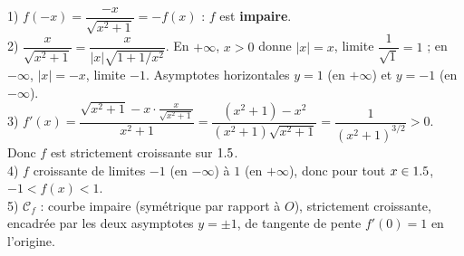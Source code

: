 1) $f(-x)=\dfrac{-x}{\sqrt{x^{2}+1}}=-f(x)$ : $f$ est \textbf{impaire}.\\
2) $\dfrac{x}{\sqrt{x^{2}+1}}=\dfrac{x}{|x|\sqrt{1+1/x^{2}}}$. En $+\infty$, $x>0$ donne $|x|=x$,
limite $\dfrac1{\sqrt1}=1$ ; en $-\infty$, $|x|=-x$, limite $-1$. Asymptotes horizontales
$y=1$ (en $+\infty$) et $y=-1$ (en $-\infty$).\\
3) $f'(x)=\dfrac{\sqrt{x^{2}+1}-x\cdot\frac{x}{\sqrt{x^{2}+1}}}{x^{2}+1}
=\dfrac{(x^{2}+1)-x^{2}}{(x^{2}+1)\sqrt{x^{2}+1}}=\dfrac{1}{(x^{2}+1)^{3/2}}>0$.
Donc $f$ est strictement croissante sur $1.5$.\\
4) $f$ croissante de limites $-1$ (en $-\infty$) à $1$ (en $+\infty$), donc pour tout
$x\in1.5$, $-1<f(x)<1$.\\
5) $\mathcal C_f$ : courbe impaire (symétrique par rapport à $O$), strictement croissante,
encadrée par les deux asymptotes $y=\pm1$, de tangente de pente $f'(0)=1$ en l'origine.
